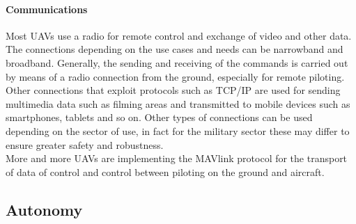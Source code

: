 \paragraph{Communications}
Most UAVs use a radio for remote control and exchange of video and other data.
The connections depending on the use cases and needs can be narrowband and
broadband. Generally, the sending and receiving of the commands is carried out
by means of a radio connection from the ground, especially for remote piloting.\\
Other connections that exploit protocols such as TCP/IP are used for sending
multimedia data such as filming areas and transmitted to mobile devices such as
smartphones, tablets and so on.
Other types of connections can be used depending on the sector of use, in fact
for the military sector these may differ to ensure greater safety and
robustness.\\ 
More and more UAVs are implementing the MAVlink protocol for the
transport of data of control and control between piloting on the ground and
aircraft.
%
%
\subsection{Autonomy}
\label{ssec:autonomy}





